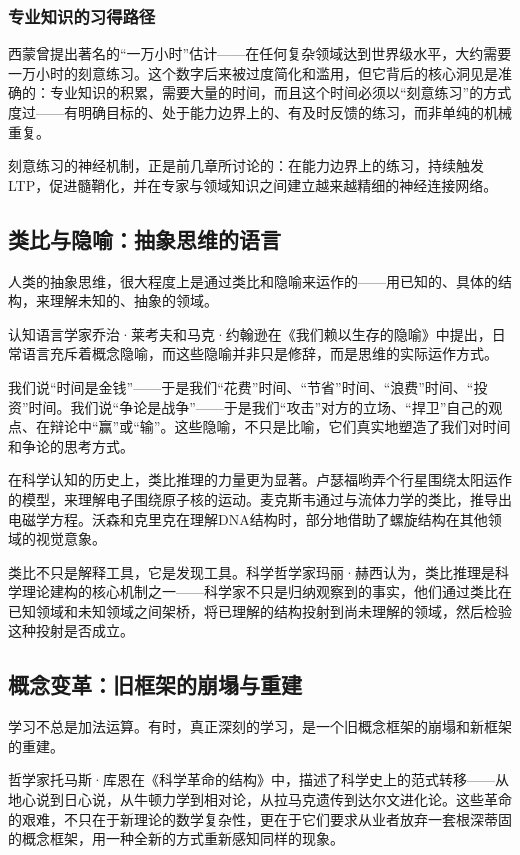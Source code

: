 \documentclass[11pt]{article}
\begin{document}
\subsubsection{专业知识的习得路径}
\label{sec:org057495d}

西蒙曾提出著名的“一万小时”估计——在任何复杂领域达到世界级水平，大约需要一万小时的刻意练习。这个数字后来被过度简化和滥用，但它背后的核心洞见是准确的：专业知识的积累，需要大量的时间，而且这个时间必须以“刻意练习”的方式度过——有明确目标的、处于能力边界上的、有及时反馈的练习，而非单纯的机械重复。

刻意练习的神经机制，正是前几章所讨论的：在能力边界上的练习，持续触发LTP，促进髓鞘化，并在专家与领域知识之间建立越来越精细的神经连接网络。
\subsection{类比与隐喻：抽象思维的语言}
\label{sec:orgc36753b}

人类的抽象思维，很大程度上是通过类比和隐喻来运作的——用已知的、具体的结构，来理解未知的、抽象的领域。

认知语言学家乔治·莱考夫和马克·约翰逊在《我们赖以生存的隐喻》中提出，日常语言充斥着概念隐喻，而这些隐喻并非只是修辞，而是思维的实际运作方式。

我们说“时间是金钱”——于是我们“花费”时间、“节省”时间、“浪费”时间、“投资”时间。我们说“争论是战争”——于是我们“攻击”对方的立场、“捍卫”自己的观点、在辩论中“赢”或“输”。这些隐喻，不只是比喻，它们真实地塑造了我们对时间和争论的思考方式。

在科学认知的历史上，类比推理的力量更为显著。卢瑟福哟弄个行星围绕太阳运作的模型，来理解电子围绕原子核的运动。麦克斯韦通过与流体力学的类比，推导出电磁学方程。沃森和克里克在理解DNA结构时，部分地借助了螺旋结构在其他领域的视觉意象。

类比不只是解释工具，它是发现工具。科学哲学家玛丽·赫西认为，类比推理是科学理论建构的核心机制之一——科学家不只是归纳观察到的事实，他们通过类比在已知领域和未知领域之间架桥，将已理解的结构投射到尚未理解的领域，然后检验这种投射是否成立。
\subsection{概念变革：旧框架的崩塌与重建}
\label{sec:org14f1cd2}

学习不总是加法运算。有时，真正深刻的学习，是一个旧概念框架的崩塌和新框架的重建。

哲学家托马斯·库恩在《科学革命的结构》中，描述了科学史上的范式转移——从地心说到日心说，从牛顿力学到相对论，从拉马克遗传到达尔文进化论。这些革命的艰难，不只在于新理论的数学复杂性，更在于它们要求从业者放弃一套根深蒂固的概念框架，用一种全新的方式重新感知同样的现象。
\end{document}
